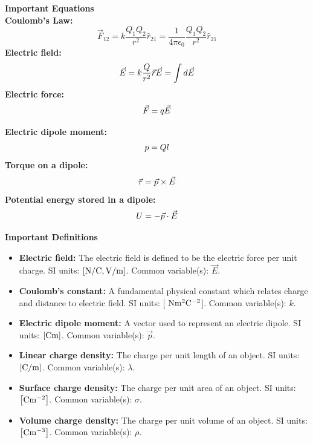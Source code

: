\begin{framed}
\textbf{Important Equations}\\
\textbf{Coulomb's Law:}
\begin{equation}
\vec F_{12}=k\frac{Q_1Q_2}{r^2}\hat r_{21}=\frac{1}{4\pi\epsilon_0}\frac{Q_1Q_2}{r^2}\hat r_{21}
\end{equation}
\textbf{Electric field:}
\begin{equation}
\vec E = k \frac{Q}{r^2}\vec r \\
\vec E = \int d \vec E \\
\end{equation}
\textbf{Electric force:}
\begin{equation}
\vec F = q \vec E \\
\end{equation}

\textbf{Electric dipole moment:}
\begin{equation}
p = Ql \\
\end{equation}
\textbf{Torque on a dipole:}
\begin{equation}
\vec \tau = \vec p \times \vec E \\
\end{equation}
\textbf{Potential energy stored in a dipole:}
\begin{equation}
U = -\vec p \cdot \vec E \\
\end{equation}
\end{framed}

\begin{framed}
\textbf{Important Definitions}\\
\begin{itemize}
\item \textbf{Electric field:} The electric field is defined to be the electric force per unit charge. SI units: ${\rm \left[{N/C}, {\rm V/m}\right]}$. Common variable(s): $\vec E$.
\item \textbf{Coulomb's constant:} A fundamental physical constant which relates charge and distance to electric field. SI units: [ ${\rm Nm^2C^{ -2}}$]. Common variable(s): $k$.
\item \textbf{Electric dipole moment:} A vector used to represent an electric dipole. SI units: ${\rm \left[{Cm}\right]}$. Common variable(s): $\vec p$.
\item \textbf{Linear charge density:} The charge per unit length of an object. SI units: ${\rm \left[{C/m}\right]}$. Common variable(s): $\lambda$.
\item \textbf{Surface charge density:} The charge per unit area of an object. SI units: ${\rm \left[{Cm^{ -2}}\right]}$. Common variable(s): $\sigma$.
\item \textbf{Volume charge density:} The charge per unit volume of an object. SI units: ${\rm \left[{Cm^{ -3}}\right]}$. Common variable(s): $\rho$.
\end{itemize}
\end{framed}

